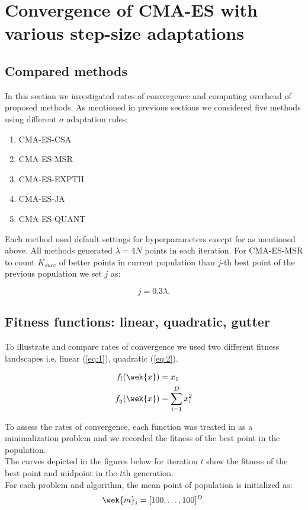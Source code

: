 \section{Convergence of CMA-ES with various step-size adaptations}
\subsection{Compared methods}

In this section we investigated rates of convergence and computing overhead of proposed methods. 
As mentioned in previous sections we considered five methods using different $\sigma$ adaptation rules:
  \begin{enumerate}
    \item CMA-ES-CSA
    \item CMA-ES-MSR
    \item CMA-ES-EXPTH
    \item CMA-ES-JA
    \item CMA-ES-QUANT
  \end{enumerate}

Each method used default settings for hyperparameters execpt for as mentioned above. All methods generated $\lambda = 4N$ points in each iteration.
For CMA-ES-MSR to count $K_{succ}$ of better points in current population than $j$-th best point of the previous population we set $j$ as:

\begin{equation*}
j = 0.3\lambda.
\end{equation*}

\subsection{Fitness functions: linear, quadratic, gutter}

To illustrate and compare rates of convergence we used two different fitness landscapes i.e. linear (\ref{eq:1}), quadratic
(\ref{eq:2}).

\begin{align}
  f_{l}(\wek{x}) &= x_{1}  \label{eq:1} \\
  f_{q}(\wek{x}) &= \sum^{D}_{i = 1} x^{2}_{i} \label{eq:2} \\
\end{align}

To assess the rates of convergence, each function was treated in as a minimalization problem and we recorded the fitness of the best point in the population. \\
The curves depicted in the figures below for iteration $t$ show the fitness of the best point and midpoint in the $t$th generation. \\ 
For each problem and algorithm, the mean point of population is initialized as:
\begin{equation*}
  \wek{m}_{i} = [100, \dots, 100]^{D}.
\end{equation*}

